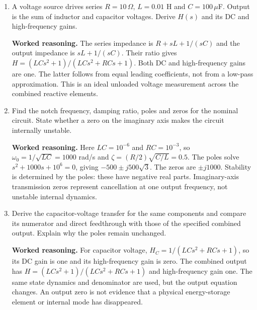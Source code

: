 \documentclass[10pt,a4paper]{article}
\newcommand{\answer}{\par\smallskip\textbf{Worked reasoning.} }
\begin{document}
\begin{enumerate}
\item A voltage source drives series $R=10\,\Omega$, $L=0.01$ H and $C=100\,\mu$F. Output is the sum of inductor and capacitor voltages. Derive $H(s)$ and its DC and high-frequency gains.
\answer The series impedance is $R+sL+1/(sC)$ and the output impedance is $sL+1/(sC)$. Their ratio gives $H=(LCs^2+1)/(LCs^2+RCs+1)$. Both DC and high-frequency gains are one. The latter follows from equal leading coefficients, not from a low-pass approximation. This is an ideal unloaded voltage measurement across the combined reactive elements.
\item Find the notch frequency, damping ratio, poles and zeros for the nominal circuit. State whether a zero on the imaginary axis makes the circuit internally unstable.
\answer Here $LC=10^{-6}$ and $RC=10^{-3}$, so $\omega_0=1/\sqrt{LC}=1000$ rad/s and $\zeta=(R/2)\sqrt{C/L}=0.5$. The poles solve $s^2+1000s+10^6=0$, giving $-500\pm j500\sqrt3$. The zeros are $\pm j1000$. Stability is determined by the poles: these have negative real parts. Imaginary-axis transmission zeros represent cancellation at one output frequency, not unstable internal dynamics.
\item Derive the capacitor-voltage transfer for the same components and compare its numerator and direct feedthrough with those of the specified combined output. Explain why the poles remain unchanged.
\answer For capacitor voltage, $H_C=1/(LCs^2+RCs+1)$, so its DC gain is one and its high-frequency gain is zero. The combined output has $H=(LCs^2+1)/(LCs^2+RCs+1)$ and high-frequency gain one. The same state dynamics and denominator are used, but the output equation changes. An output zero is not evidence that a physical energy-storage element or internal mode has disappeared.
\end{enumerate}
\end{document}
